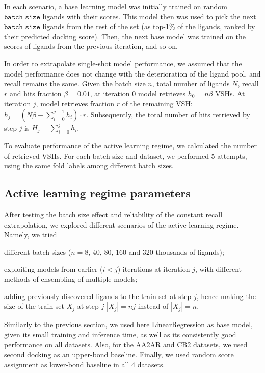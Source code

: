 In each scenario, a base learning model was initially trained on random $\texttt{batch\_size}$ ligands with their scores. This model then was used to pick the next $\texttt{batch\_size}$ ligands from the rest of the set (as top-1\% of the ligands, ranked by their predicted docking score). Then, the next base model was trained on the scores of ligands from the previous iteration, and so on.

In order to extrapolate single-shot model performance, we assumed that the model performance does not change with the deterioration of the ligand pool, and recall remains the same. Given the batch size $n$, total number of ligands $N$, recall $r$ and hits fraction $\beta=0.01$, at iteration 0 model retrieves $h_0 = n\beta$ VSHs. At iteration $j$, model retrieves fraction $r$ of the remaining VSH: $h_j = ( N\beta - \sum_{i=0}^{j-1}h_i ) \cdot r$. Subsequently, the total number of hits retrieved by step $j$ is $H_j = \sum_{i=0}^{j} h_i$.

To evaluate performance of the active learning regime, we calculated the number of retrieved VSHs. For each batch size and dataset, we performed 5 attempts, using the same fold labels among different batch sizes.

\subsection{Active learning regime parameters}

After testing the batch size effect and reliability of the constant recall extrapolation, we explored different scenarios of the active learning regime. Namely, we tried
\begin{enumerate*}[label=(\roman*)]
    \item different batch sizes ($n=8$, 40, 80, 160 and 320 thousands of ligands);
    \item exploiting models from earlier ($i < j$) iterations at iteration $j$, with different methods of ensembling of multiple models;
    \item adding previously discovered ligands to the train set at step $j$, hence making the size of the train set $X_j$ at step $j$ $|X_j| = nj$ instead of $|X_j|=n$.
\end{enumerate*}

Similarly to the previous section, we used here LinearRegression as base model, given its small training and inference time, as well as its consistently good performance on all datasets. Also, for the AA2AR and CB2 datasets, we used second docking as an upper-bond baseline. Finally, we used random score assignment as lower-bond baseline in all 4 datasets. 

